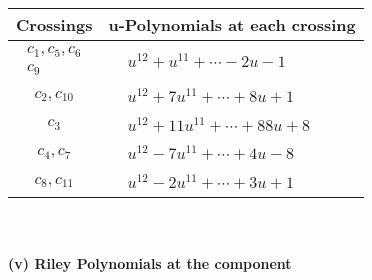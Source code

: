 \documentclass[1p]{elsarticle_modified}
\theoremstyle{definition}
\begin{document}
\begin{tabular}{m{50pt}|m{274pt}}
Crossings & \hspace{64pt}u-Polynomials at each crossing \\
\hline $$\begin{aligned}c_{1},c_{5},c_{6}\\c_{9}\end{aligned}$$&$\begin{aligned}
&u^{12}+u^{11}+\cdots-2 u-1
\end{aligned}$\\
\hline $$\begin{aligned}c_{2},c_{10}\end{aligned}$$&$\begin{aligned}
&u^{12}+7 u^{11}+\cdots+8 u+1
\end{aligned}$\\
\hline $$\begin{aligned}c_{3}\end{aligned}$$&$\begin{aligned}
&u^{12}+11 u^{11}+\cdots+88 u+8
\end{aligned}$\\
\hline $$\begin{aligned}c_{4},c_{7}\end{aligned}$$&$\begin{aligned}
&u^{12}-7 u^{11}+\cdots+4 u-8
\end{aligned}$\\
\hline $$\begin{aligned}c_{8},c_{11}\end{aligned}$$&$\begin{aligned}
&u^{12}-2 u^{11}+\cdots+3 u+1
\end{aligned}$\\
\hline
\end{tabular}\\~\\
\newpage\renewcommand{\arraystretch}{1}
\flushleft \textbf{(v) Riley Polynomials at the component}\newline \\
\end{document}
